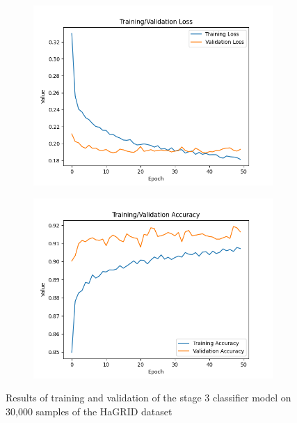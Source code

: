 \documentclass{article}
\begin{document}
\begin{figure}[h]
    \centering
    \begin{subfigure}[T]{0.5\textwidth}
        \centering
        \includegraphics[width=\linewidth]{loss_graph.png}
    \end{subfigure}\hfill
    \begin{subfigure}[T]{0.5\textwidth}
        \centering
        \includegraphics[width=\linewidth]{accuracy_graph.png}
    \end{subfigure}
    \caption{Results of training and validation of the stage 3 classifier model on 30,000 samples of the HaGRID \cite{Alexander_2024} dataset}
    \label{fig:graphs}
\end{figure}
\end{document}
